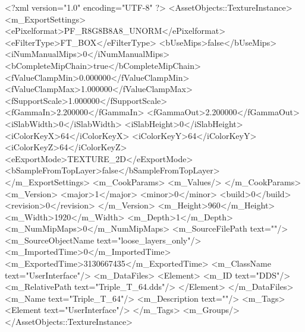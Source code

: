<?xml version="1.0" encoding="UTF-8" ?>
<AssetObjects::TextureInstance>
	<m_ExportSettings>
		<ePixelformat>PF_R8G8B8A8_UNORM</ePixelformat>
		<eFilterType>FT_BOX</eFilterType>
		<bUseMips>false</bUseMips>
		<iNumManualMips>0</iNumManualMips>
		<bCompleteMipChain>true</bCompleteMipChain>
		<fValueClampMin>0.000000</fValueClampMin>
		<fValueClampMax>1.000000</fValueClampMax>
		<fSupportScale>1.000000</fSupportScale>
		<fGammaIn>2.200000</fGammaIn>
		<fGammaOut>2.200000</fGammaOut>
		<iSlabWidth>0</iSlabWidth>
		<iSlabHeight>0</iSlabHeight>
		<iColorKeyX>64</iColorKeyX>
		<iColorKeyY>64</iColorKeyY>
		<iColorKeyZ>64</iColorKeyZ>
		<eExportMode>TEXTURE_2D</eExportMode>
		<bSampleFromTopLayer>false</bSampleFromTopLayer>
	</m_ExportSettings>
	<m_CookParams>
		<m_Values/>
	</m_CookParams>
	<m_Version>
		<major>1</major>
		<minor>0</minor>
		<build>0</build>
		<revision>0</revision>
	</m_Version>
	<m_Height>960</m_Height>
	<m_Width>1920</m_Width>
	<m_Depth>1</m_Depth>
	<m_NumMipMaps>0</m_NumMipMaps>
	<m_SourceFilePath text=""/>
	<m_SourceObjectName text="loose_layers_only"/>
	<m_ImportedTime>0</m_ImportedTime>
	<m_ExportedTime>3130667435</m_ExportedTime>
	<m_ClassName text="UserInterface"/>
	<m_DataFiles>
		<Element>
			<m_ID text="DDS"/>
			<m_RelativePath text="Triple_T_64.dds"/>
		</Element>
	</m_DataFiles>
	<m_Name text="Triple_T_64"/>
	<m_Description text=""/>
	<m_Tags>
		<Element text="UserInterface"/>
	</m_Tags>
	<m_Groups/>
</AssetObjects::TextureInstance>

